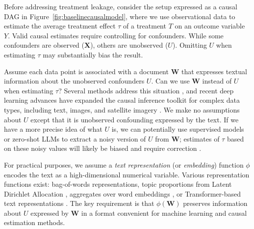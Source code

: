 \documentclass[11pt]{article}
\newcommand{\bX}{\bm{X}} %
\newcommand{\bW}{\bm{W}}  %
\begin{document}
Before addressing treatment leakage, consider the setup expressed as a causal DAG in Figure~\ref{fig:baselinecausalmodel}, where we use observational data to estimate the average treatment effect $\tau$ of a treatment $T$ on an outcome variable $Y$. Valid causal estimates require controlling for confounders. While some confounders are observed ($\bX$), others are unobserved ($U$). Omitting $U$ when estimating $\tau$ may substantially bias the result.

Assume each data point is associated with a document $\bm{W}$ that expresses textual information about the unobserved confounders $U$. Can we use $\bW$ instead of $U$ when estimating $\tau$?
Several methods address this situation \citep{keith2020,mozer2020}, and recent deep learning advances have expanded the causal inference toolkit for complex data types, including text, images, and satellite imagery \citep{balgi2025deeplearning,jerzakImageEconometrics2023,daoudSatelliteIndia2023}.
We make no assumptions about $U$ except that it is unobserved confounding expressed by the text. If we have a more precise idea of what $U$ is, we can potentially use supervised models or zero-shot LLMs to extract a noisy version of $U$ from $\bW$; estimates of $\tau$ based on these noisy values will likely be biased and require correction \citep{egami2023dsl}.

For practical purposes, we assume a \emph{text representation} (or \emph{embedding}) function $\phi$ encodes the text as a high-dimensional numerical variable. Various representation functions exist: bag-of-words representations, topic proportions from Latent Dirichlet Allocation \citep{blei2003}, aggregates over word embeddings \citep{mozer2020}, or Transformer-based text representations \citep{veitch2020}.
%
The key requirement is that $\phi(\bW)$ preserves information about $U$ expressed by $\bW$ in a format convenient for machine learning and causal estimation methods.
\end{document}

